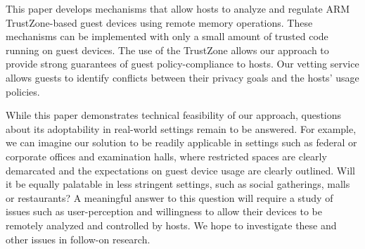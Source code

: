 \documentclass[pageno]{sig-alternate-05-2015}
\newcommand{\eg}{\textit{e.g.,}}
\begin{document}
This paper develops mechanisms that allow hosts to analyze and regulate ARM
TrustZone-based guest devices using remote memory operations.  These mechanisms
can be implemented with only a small amount of trusted code running on guest
devices. The use of the TrustZone allows our approach to provide strong
guarantees of guest policy-compliance to hosts. Our vetting service allows
guests to identify conflicts between their privacy goals and the hosts' usage
policies. 

While this paper demonstrates technical feasibility of our approach, questions
about its adoptability in real-world settings remain to be answered. For
example, we can imagine our solution to be readily applicable in settings such
as federal or corporate offices and examination halls, where restricted spaces
are clearly demarcated and the expectations on guest device usage are clearly
outlined.  Will it be equally palatable in less stringent settings, such as
social gatherings, malls or restaurants? A meaningful answer to this question
will require a study of issues such as user-perception and willingness to allow
their devices to be remotely analyzed and controlled by hosts. We hope to 
investigate these and other issues in follow-on research.


% 
%
%
\end{document}
